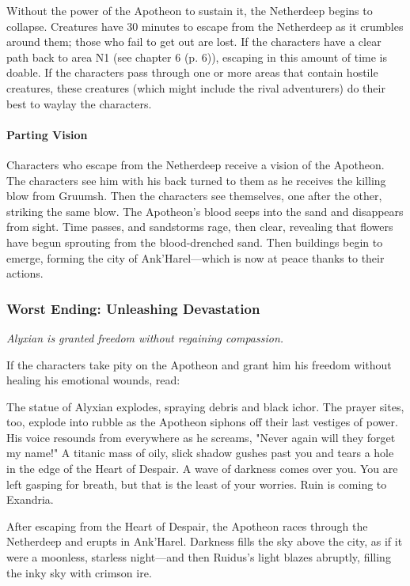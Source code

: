 \documentclass[a4paper, 11pt, bg=full, twocolumn, nooutline]{dndbook}
\begin{document}
Without the power of the Apotheon to sustain it, the Netherdeep begins to collapse. Creatures have 30 minutes to escape from the Netherdeep as it crumbles around them; those who fail to get out are lost. If the characters have a clear path back to area N1 (see chapter 6 (p. 6)), escaping in this amount of time is doable. If the characters pass through one or more areas that contain hostile creatures, these creatures (which might include the rival adventurers) do their best to waylay the characters.

\paragraph{Parting Vision}

Characters who escape from the Netherdeep receive a vision of the Apotheon. The characters see him with his back turned to them as he receives the killing blow from Gruumsh. Then the characters see themselves, one after the other, striking the same blow. The Apotheon's blood seeps into the sand and disappears from sight. Time passes, and sandstorms rage, then clear, revealing that flowers have begun sprouting from the blood-drenched sand. Then buildings begin to emerge, forming the city of Ank'Harel---which is now at peace thanks to their actions.

\subsubsection{Worst Ending: Unleashing Devastation}

\textit{Alyxian is granted freedom without regaining compassion.}

If the characters take pity on the Apotheon and grant him his freedom without healing his emotional wounds, read:

\begin{DndReadAloud}
The statue of Alyxian explodes, spraying debris and black ichor. The prayer sites, too, explode into rubble as the Apotheon siphons off their last vestiges of power. His voice resounds from everywhere as he screams, "Never again will they forget my name!" A titanic mass of oily, slick shadow gushes past you and tears a hole in the edge of the Heart of Despair.
A wave of darkness comes over you. You are left gasping for breath, but that is the least of your worries.
Ruin is coming to Exandria.
\end{DndReadAloud}

After escaping from the Heart of Despair, the Apotheon races through the Netherdeep and erupts in Ank'Harel. Darkness fills the sky above the city, as if it were a moonless, starless night---and then Ruidus's light blazes abruptly, filling the inky sky with crimson ire.
\end{document}
